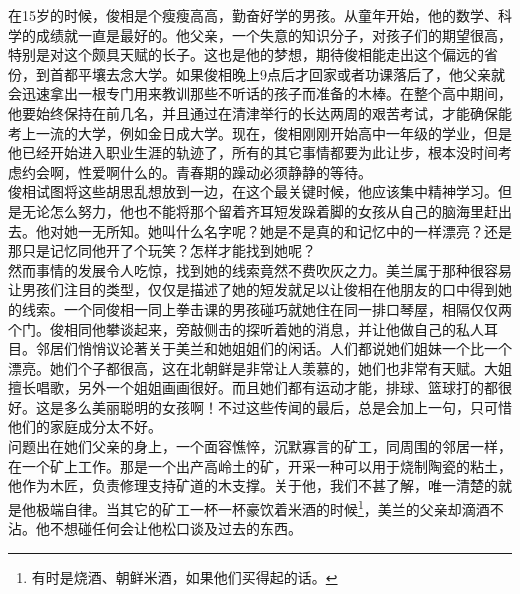 \ifnum{}
	\begin{multicols}{\theparacolNo}
\fi
在15岁的时候，俊相是个瘦瘦高高，勤奋好学的男孩。从童年开始，他的数学、科学的成绩就一直是最好的。他父亲，一个失意的知识分子，对孩子们的期望很高，特别是对这个颇具天赋的长子。这也是他的梦想，期待俊相能走出这个偏远的省份，到首都平壤去念大学。如果俊相晚上9点后才回家或者功课落后了，他父亲就会迅速拿出一根专门用来教训那些不听话的孩子而准备的木棒。在整个高中期间，他要始终保持在前几名，并且通过在清津举行的长达两周的艰苦考试，才能确保能考上一流的大学，例如金日成大学。现在，俊相刚刚开始高中一年级的学业，但是他已经开始进入职业生涯的轨迹了，所有的其它事情都要为此让步，根本没时间考虑约会啊，性爱啊什么的。青春期的躁动必须静静的等待。\\

俊相试图将这些胡思乱想放到一边，在这个最关键时候，他应该集中精神学习。但是无论怎么努力，他也不能将那个留着齐耳短发跺着脚的女孩从自己的脑海里赶出去。他对她一无所知。她叫什么名字呢？她是不是真的和记忆中的一样漂亮？还是那只是记忆同他开了个玩笑？怎样才能找到她呢？\\

然而事情的发展令人吃惊，找到她的线索竟然不费吹灰之力。美兰属于那种很容易让男孩们注目的类型，仅仅是描述了她的短发就足以让俊相在他朋友的口中得到她的线索。一个同俊相一同上拳击课的男孩碰巧就她住在同一排口琴屋，相隔仅仅两个门。俊相同他攀谈起来，旁敲侧击的探听着她的消息，并让他做自己的私人耳目。邻居们悄悄议论著关于美兰和她姐姐们的闲话。人们都说她们姐妹一个比一个漂亮。她们个子都很高，这在北朝鲜是非常让人羡慕的，她们也非常有天赋。大姐擅长唱歌，另外一个姐姐画画很好。而且她们都有运动才能，排球、篮球打的都很好。这是多么美丽聪明的女孩啊！不过这些传闻的最后，总是会加上一句，只可惜他们的家庭成分太不好。\\

问题出在她们父亲的身上，一个面容憔悴，沉默寡言的矿工，同周围的邻居一样，在一个矿上工作。那是一个出产高岭土的矿，开采一种可以用于烧制陶瓷的粘土，他作为木匠，负责修理支持矿道的木支撑。关于他，我们不甚了解，唯一清楚的就是他极端自律。当其它的矿工一杯一杯豪饮着米酒的时候\footnote{有时是烧酒、朝鲜米酒，如果他们买得起的话。}，美兰的父亲却滴酒不沾。他不想碰任何会让他松口谈及过去的东西。\\


\end{multicols}
